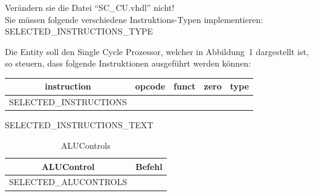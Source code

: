 \documentclass[a4paper,12pt]{article}
\newcommand\Tstrut{\rule{0pt}{2.6ex}}       %
\begin{document}
Ver\"andern sie die Datei "`SC\_CU.vhdl"' nicht!
\\

Sie m\"ussen folgende verschiedene Instruktions-Typen implementieren:
{{SELECTED_INSTRUCTIONS_TYPE}}

Die Entity soll den Single Cycle Prozessor, welcher in Abbildung~1 dargestellt ist, so steuern, dass folgende Instruktionen ausgef\"uhrt werden k\"onnen:

\begin{table}[h!]
\centering
    \begin{tabular}{|c|c|c|c|c|} \hline \Tstrut
		instruction & opcode  & funct	& zero & type   \\ \hline \Tstrut
		{{SELECTED_INSTRUCTIONS}}
    \hline
    \end{tabular}
\end{table}

{{SELECTED_INSTRUCTIONS_TEXT}} \\

\begin{table}[h!]
\centering
    \begin{tabular}{|c|c|} \hline \Tstrut
		ALUControl & Befehl   \\ \hline \Tstrut
		{{SELECTED_ALUCONTROLS}}
    \hline
    \end{tabular}
    \caption{ALUControls}
    \label{tab:ALUControls}
\end{table}
\end{document}
